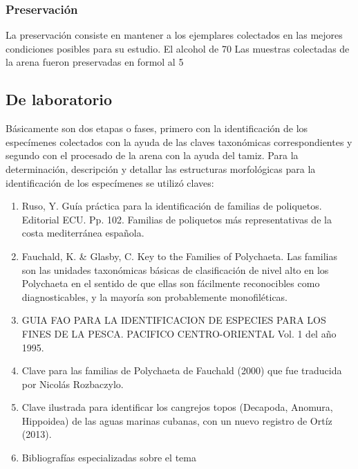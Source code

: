 \documentclass[5p,times,authoryear]{elsarticle}
\begin{document}
\subsubsection{Preservaci\'on}
La preservaci\'on consiste en mantener a los ejemplares colectados en las mejores condiciones posibles para su estudio. El alcohol de 70%
Las muestras colectadas de la arena fueron preservadas en formol al 5%

\subsection{De laboratorio}
B\'asicamente son dos etapas o fases, primero con la identificaci\'on de los espec\'imenes colectados con la ayuda de las claves taxon\'omicas correspondientes y segundo con el procesado de la arena con la ayuda del tamiz. Para la determinaci\'on, descripci\'on y detallar las estructuras morfol\'ogicas para la identificaci\'on de los espec\'imenes se utiliz\'o claves:
\begin{enumerate}
\item Ruso, Y. Gu\'ia pr\'actica para la identificaci\'on de familias de poliquetos. Editorial ECU. Pp. 102. Familias de poliquetos m\'as representativas de la costa mediterr\'anea espa\~nola.
\item Fauchald, K. \& Glasby, C. Key to the Families of Polychaeta. Las familias son las unidades taxon\'omicas b\'asicas de clasificaci\'on de nivel alto en los Polychaeta en el sentido de que ellas son f\'acilmente reconocibles como diagnosticables, y la mayor\'ia son probablemente monofil\'eticas.
\item GUIA FAO PARA LA IDENTIFICACION DE ESPECIES PARA LOS FINES DE LA PESCA. PACIFICO CENTRO-ORIENTAL Vol. 1 del a\~no 1995.
\item Clave para las familias de Polychaeta de Fauchald (2000) que fue traducida por Nicol\'as Rozbaczylo.
\item Clave ilustrada para identificar los cangrejos topos (Decapoda, Anomura, Hippoidea) de las aguas marinas cubanas, con un nuevo registro de Ort\'iz (2013).
\item Bibliograf\'ias especializadas sobre el tema
\end{enumerate}
\end{document}
